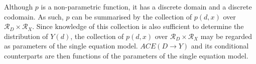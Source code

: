 \documentclass[12pt,a4paper,twoside]{article}
\numberwithin{equation}{section}
\begin{document}
Although $p$ is a non-parametric function, it has a discrete domain and a discrete codomain. As such, $p$ can be summarised by the collection of $p(d,x)$ over $\mathcal{R}_D\times\mathcal{R}_X$. Since knowledge of this collection is also sufficient to determine the distribution of $Y(d)$, the collection of $p(d,x)$ over $\mathcal{R}_D\times\mathcal{R}_X$ may be regarded as parameters of the single equation model. $ACE(D\rightarrow Y)$ and its conditional counterparts are then functions of the parameters of the single equation model.
%
%
%
\end{document}
